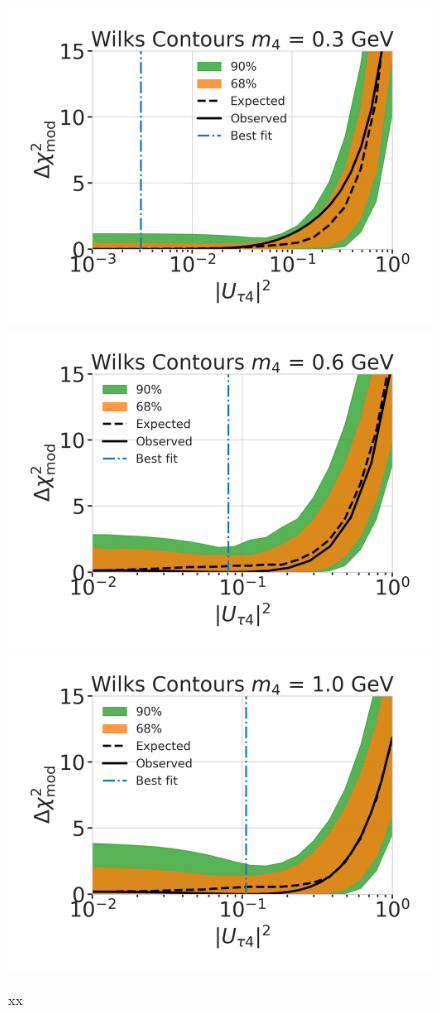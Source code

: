 \begin{figure}[h]
    \includegraphics[width=0.32\linewidth]{figures/results/best_fit/brazil_band_0.3_GeV_with_bfp.png}
    \includegraphics[width=0.32\linewidth]{figures/results/best_fit/brazil_band_0.6_GeV_with_bfp.png}
    \includegraphics[width=0.32\linewidth]{figures/results/best_fit/brazil_band_1.0_GeV_with_bfp.png}
	\caption[xx]{xx}
\end{figure}






